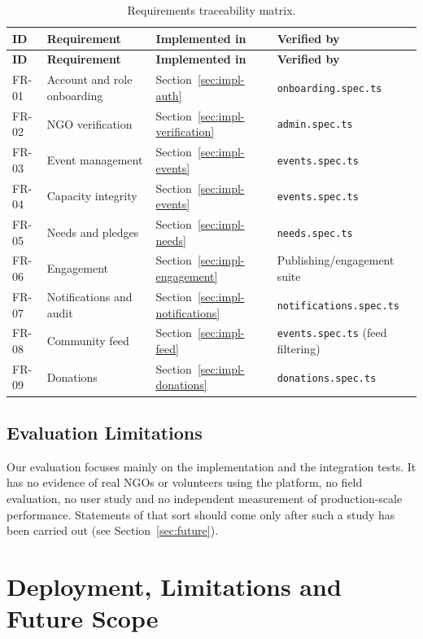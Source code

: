 \begin{longtable}{|p{}|p{}|p{}|p{}|}
\caption{Requirements traceability matrix.}\label{tab:traceability}\\\hline
\textbf{ID} & \textbf{Requirement} & \textbf{Implemented in} & \textbf{Verified by}\\\hline
\endfirsthead
\hline
\textbf{ID} & \textbf{Requirement} & \textbf{Implemented in} & \textbf{Verified by}\\\hline
\endhead
FR-01 & Account and role onboarding & Section~\ref{sec:impl-auth} & \texttt{onboarding.spec.ts}\\\hline
FR-02 & NGO verification & Section~\ref{sec:impl-verification} & \texttt{admin.spec.ts}\\\hline
FR-03 & Event management & Section~\ref{sec:impl-events} & \texttt{events.spec.ts}\\\hline
FR-04 & Capacity integrity & Section~\ref{sec:impl-events} & \texttt{events.spec.ts}\\\hline
FR-05 & Needs and pledges & Section~\ref{sec:impl-needs} & \texttt{needs.spec.ts}\\\hline
FR-06 & Engagement & Section~\ref{sec:impl-engagement} & Publishing/engagement suite\\\hline
FR-07 & Notifications and audit & Section~\ref{sec:impl-notifications} & \texttt{notifications.spec.ts}\\\hline
FR-08 & Community feed & Section~\ref{sec:impl-feed} & \texttt{events.spec.ts} (feed filtering)\\\hline
FR-09 & Donations & Section~\ref{sec:impl-donations} & \texttt{donations.spec.ts}\\\hline
\end{longtable}

\section{Evaluation Limitations}
Our evaluation focuses mainly on the implementation and the integration tests. It has no evidence of real NGOs or volunteers using the platform, no field evaluation, no user study and no independent measurement of production-scale performance. Statements of that sort should come only after such a study has been carried out (see Section~\ref{sec:future}).

\chapter[Deployment, Limitations and Future Scope]{Deployment, Limitations and Future Scope}
\label{ch:deployment}

